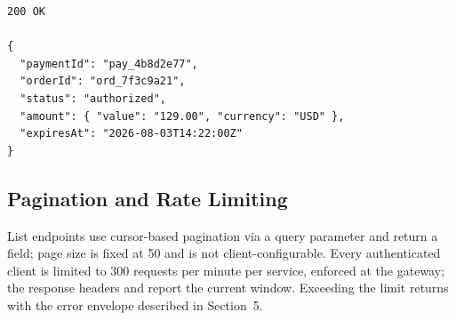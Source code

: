 \begin{lstlisting}
200 OK

{
  "paymentId": "pay_4b8d2e77",
  "orderId": "ord_7f3c9a21",
  "status": "authorized",
  "amount": { "value": "129.00", "currency": "USD" },
  "expiresAt": "2026-08-03T14:22:00Z"
}
\end{lstlisting}

\subsection{Pagination and Rate Limiting}
List endpoints use cursor-based pagination via a  query parameter and return a
 field; page size is fixed at 50 and is not client-configurable. Every
authenticated client is limited to 300 requests per minute per service, enforced at the
gateway; the response headers  and  report
the current window. Exceeding the limit returns  with the error envelope described
in Section~5.
